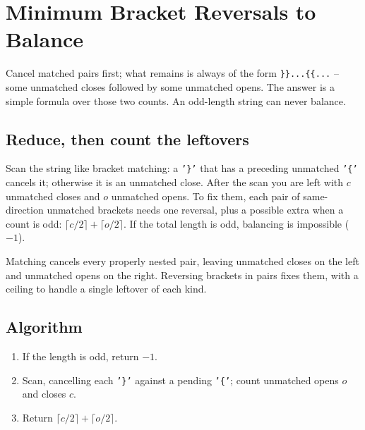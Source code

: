 \section{Minimum Bracket Reversals to Balance}
\label{sec:str-min-bracket-reversals}


\begin{patternbox}
Cancel matched pairs first; what remains is always of the form
\texttt{\}\}...\{\{...} -- some unmatched closes followed by some unmatched
opens. The answer is a simple formula over those two counts. An odd-length
string can never balance.
\end{patternbox}

\subsection*{Reduce, then count the leftovers}

Scan the string like bracket matching: a \texttt{'\}'} that has a preceding
unmatched \texttt{'\{'} cancels it; otherwise it is an unmatched close.
After the scan you are left with $c$ unmatched closes and $o$ unmatched
opens. To fix them, each pair of same-direction unmatched brackets needs one
reversal, plus a possible extra when a count is odd:
$\lceil c/2\rceil+\lceil o/2\rceil$. If the total length is odd, balancing is
impossible ($-1$).

\begin{ideabox}
Matching cancels every properly nested pair, leaving unmatched closes on the
left and unmatched opens on the right. Reversing brackets in pairs fixes
them, with a ceiling to handle a single leftover of each kind.
\end{ideabox}

\subsection*{Algorithm}

\begin{enumerate}
  \item If the length is odd, return $-1$.
  \item Scan, cancelling each \texttt{'\}'} against a pending \texttt{'\{'};
        count unmatched opens $o$ and closes $c$.
  \item Return $\lceil c/2\rceil+\lceil o/2\rceil$.
\end{enumerate}

